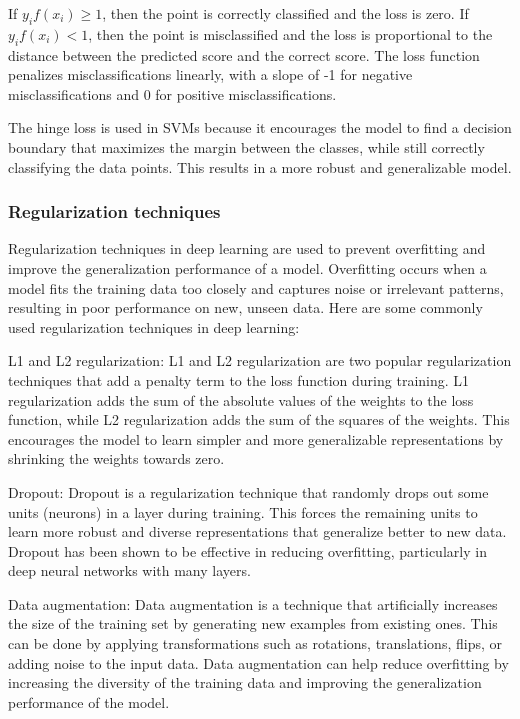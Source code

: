 If $y_i f(x_i) \geq 1$, then the point is correctly classified and the loss is zero. If $y_i f(x_i) < 1$, then the point is misclassified and the loss is proportional to the distance between the predicted score and the correct score. The loss function penalizes misclassifications linearly, with a slope of -1 for negative misclassifications and 0 for positive misclassifications.

The hinge loss is used in SVMs because it encourages the model to find a decision boundary that maximizes the margin between the classes, while still correctly classifying the data points. This results in a more robust and generalizable model.

\subsubsection{Regularization techniques}
\label{subsubsec:3_regularization}

Regularization techniques in deep learning are used to prevent overfitting and improve the generalization performance of a model. Overfitting occurs when a model fits the training data too closely and captures noise or irrelevant patterns, resulting in poor performance on new, unseen data. Here are some commonly used regularization techniques in deep learning:

L1 and L2 regularization: L1 and L2 regularization are two popular regularization techniques that add a penalty term to the loss function during training. L1 regularization adds the sum of the absolute values of the weights to the loss function, while L2 regularization adds the sum of the squares of the weights. This encourages the model to learn simpler and more generalizable representations by shrinking the weights towards zero.

Dropout: Dropout is a regularization technique that randomly drops out some units (neurons) in a layer during training. This forces the remaining units to learn more robust and diverse representations that generalize better to new data. Dropout has been shown to be effective in reducing overfitting, particularly in deep neural networks with many layers.

Data augmentation: Data augmentation is a technique that artificially increases the size of the training set by generating new examples from existing ones. This can be done by applying transformations such as rotations, translations, flips, or adding noise to the input data. Data augmentation can help reduce overfitting by increasing the diversity of the training data and improving the generalization performance of the model.

